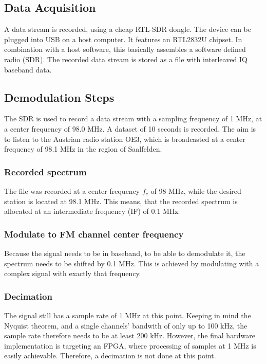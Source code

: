 \documentclass[conference]{IEEEtran}
\begin{document}

  \subsection{Data Acquisition}
    A data stream is recorded, using a cheap RTL-SDR dongle.
    The device can be plugged into USB on a host computer.
    It features an RTL2832U chipset.
    In combination with a host software, this basically assembles a software defined radio (SDR).
    The recorded data stream is stored as a file with interleaved IQ baseband data.

  \subsection{Demodulation Steps}
    The SDR is used to record a data stream with a sampling frequency of 1 MHz, at a center frequency of 98.0 MHz. A dataset of 10 seconds is recorded.
    The aim is to listen to the Austrian radio station OE3, which is broadcasted at a center frequency of 98.1 MHz in the region of Saalfelden.

    \subsubsection{Recorded spectrum}
      The file was recorded at a center frequency $f_c$ of 98 MHz, while the desired station is located at 98.1 MHz.
      This means, that the recorded spectrum is allocated at an intermediate frequency (IF) of 0.1 MHz.

    \subsubsection{Modulate to FM channel center frequency}
      Because the signal needs to be in baseband, to be able to demodulate it, the spectrum needs to be shifted by 0.1 MHz.
      This is achieved by modulating with a complex signal with exactly that frequency.

    \subsubsection{Decimation}
      The signal still has a sample rate of 1 MHz at this point.
      Keeping in mind the Nyquist theorem, and a single channels' bandwith of only up to 100 kHz, the sample rate therefore needs to be at least 200 kHz.
      However, the final hardware implementation is targeting an FPGA, where processing of samples at 1 MHz is easily achievable. Therefore, a decimation is not done at this point.
\end{document}
